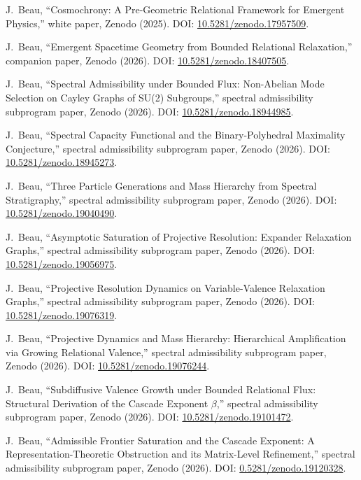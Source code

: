 J.~Beau,
``Cosmochrony: A Pre-Geometric Relational Framework for Emergent Physics,''
white paper, Zenodo (2025).
DOI: \href{https://doi.org/10.5281/zenodo.17957509}{10.5281/zenodo.17957509}.

J.~Beau,
``Emergent Spacetime Geometry from Bounded Relational Relaxation,''
companion paper, Zenodo (2026).
DOI: \href{https://doi.org/10.5281/zenodo.18407505}{10.5281/zenodo.18407505}.

J.~Beau,
``Spectral Admissibility under Bounded Flux: Non-Abelian Mode Selection on Cayley Graphs of SU(2) Subgroups,''
spectral admissibility subprogram paper, Zenodo (2026).
DOI: \href{https://doi.org/10.5281/zenodo.18944985}{10.5281/zenodo.18944985}.

J.~Beau,
``Spectral Capacity Functional and the Binary-Polyhedral Maximality Conjecture,''
spectral admissibility subprogram paper, Zenodo (2026).
DOI: \href{https://doi.org/10.5281/zenodo.18945273}{10.5281/zenodo.18945273}.

J.~Beau,
``Three Particle Generations and Mass Hierarchy from Spectral Stratigraphy,''
spectral admissibility subprogram paper, Zenodo (2026).
DOI: \href{https://doi.org/10.5281/zenodo.19040490}{10.5281/zenodo.19040490}.

J.~Beau,
``Asymptotic Saturation of Projective Resolution: Expander Relaxation Graphs,''
spectral admissibility subprogram paper, Zenodo (2026).
DOI: \href{https://doi.org/10.5281/zenodo.19056975}{10.5281/zenodo.19056975}.

J.~Beau,
``Projective Resolution Dynamics on Variable-Valence Relaxation Graphs,''
spectral admissibility subprogram paper, Zenodo (2026).
DOI: \href{https://doi.org/10.5281/zenodo.19076319}{10.5281/zenodo.19076319}.

J.~Beau,
``Projective Dynamics and Mass Hierarchy: Hierarchical Amplification via Growing Relational Valence,''
spectral admissibility subprogram paper, Zenodo (2026).
DOI: \href{https://doi.org/10.5281/zenodo.19076244}{10.5281/zenodo.19076244}.

J.~Beau,
``Subdiffusive Valence Growth under Bounded Relational Flux: Structural Derivation of the Cascade Exponent $\beta$,''
spectral admissibility subprogram paper, Zenodo (2026).
DOI: \href{https://doi.org/10.5281/zenodo.19101472}{10.5281/zenodo.19101472}.

J.~Beau,
``Admissible Frontier Saturation and the Cascade Exponent: A Representation-Theoretic Obstruction and its Matrix-Level
Refinement,''
spectral admissibility subprogram paper, Zenodo (2026).
DOI: \href{https://doi.org/10.5281/zenodo.19120328}{0.5281/zenodo.19120328}.
